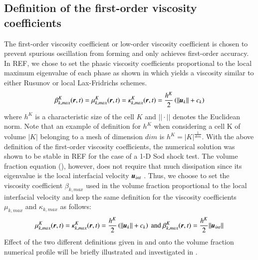 \documentclass[preprint,10pt]{elsarticle}
\begin{document}
\subsection{Definition of the first-order viscosity coefficients}\label{sec:visc-coeff-fo}
%
The first-order viscosity coefficient or low-order viscosity coefficient is chosen to prevent spurious oscillation from forming and only achieves first-order accuracy. In REF, we chose to set the phasic viscosity coefficients proportional to the local maximum eigenvalue of each phase as shown in  which yields a viscosity similar to either Rusunov or local Lax-Fridrichs schemes.
%
\begin{equation}\label{eq:visc-coeff-fo-def-1}
\beta^K_{k,max}(\boldsymbol r,t) = \mu^K_{k,max}(\boldsymbol r,t) = \kappa^K_{k,max}(\boldsymbol r,t) = \frac{h^K}{2} \left( || \boldsymbol u_k || + c_k \right)
\end{equation}
%
where $h^K$ 
is a characteristic size of the cell $K$ and $|| \cdot ||$ denotes the Euclidean norm. Note that an example of definition for $h^K$ when considering a cell K of volume $|K|$ belonging to a mesh of dimension $dim$ is $h^K = |K|^\frac{1}{dim}$. With the above definition of the first-order viscosity coefficients, the numerical solution was shown to be stable in REF for the case of a 1-D Sod shock test. The volume fraction equation (), however, does not require that much dissipation since its eigenvalue is the local interfacial velocity $\boldsymbol u_{int}$ . Thus, we choose to set the viscosity coefficient $\beta_{k,max}$ used in the volume fraction proportional to the local interfacial velocity and keep the same definition for the viscosity coefficients $\mu_{k,max}$ and $\kappa_{k,max}$ as follows:
%
\begin{equation}\label{eq:visc-coeff-fo-def-2}
\mu^K_{k,max}(\boldsymbol r,t) = \kappa^K_{k,max}(\boldsymbol r,t) = \frac{h^K}{2} \left( || \boldsymbol u_k || + c_k \right) \text{ and } \beta^K_{k,max}(\boldsymbol r,t) = \frac{h^K}{2} || \boldsymbol u_{int} ||
\end{equation}
%
Effect of the two different definitions given in  and  onto the volume fraction numerical profile will be briefly illustrated and investigated in .
%
\end{document}
